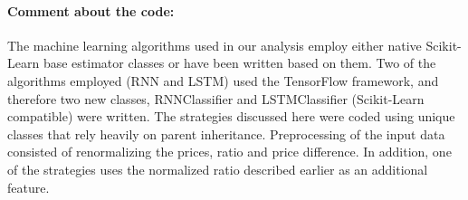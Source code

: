 \documentclass[a4paper,12pt]{article}
\begin{document}
\vspace{-0.5cm}
\hypertarget{comment-about-the-code}{%
\paragraph{Comment about the code:}\label{comment-about-the-code}}
The machine learning algorithms used in our analysis employ either native Scikit-Learn base estimator classes or have been written based on them. Two of the algorithms employed (RNN and LSTM) used the TensorFlow framework, and therefore two new classes, RNNClassifier and LSTMClassifier (Scikit-Learn compatible) were written. The strategies discussed here were coded using unique classes that rely heavily on parent inheritance. Preprocessing of the input data consisted of renormalizing the prices, ratio and price difference. In addition, one of the strategies uses the normalized ratio described earlier as an additional feature. 
\end{document}
